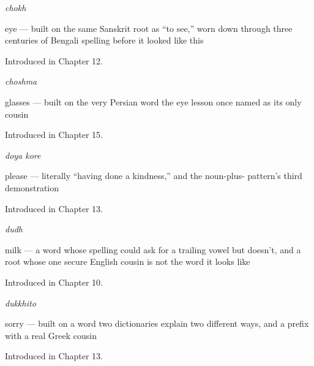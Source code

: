 \noindent\begin{minipage}[t]{\linewidth}
\raggedright
\textbf{}\enspace\emph{chokh}\par
\small eye — built on the same Sanskrit root as \textquotedblleft{}to see,\textquotedblright{} worn down through three centuries of Bengali spelling before it looked like this\par
\footnotesize Introduced in Chapter 12.
\end{minipage}\par\medskip

\noindent\begin{minipage}[t]{\linewidth}
\raggedright
\textbf{}\enspace\emph{choshma}\par
\small glasses — built on the very Persian word the eye lesson once named as its only cousin\par
\footnotesize Introduced in Chapter 15.
\end{minipage}\par\medskip

\noindent\begin{minipage}[t]{\linewidth}
\raggedright
\textbf{ }\enspace\emph{doya kore}\par
\small please — literally \textquotedblleft{}having done a kindness,\textquotedblright{} and the noun-plus- pattern's third demonstration\par
\footnotesize Introduced in Chapter 13.
\end{minipage}\par\medskip

\noindent\begin{minipage}[t]{\linewidth}
\raggedright
\textbf{}\enspace\emph{dudh}\par
\small milk — a word whose spelling could ask for a trailing vowel but doesn't, and a root whose one secure English cousin is not the word it looks like\par
\footnotesize Introduced in Chapter 10.
\end{minipage}\par\medskip

\noindent\begin{minipage}[t]{\linewidth}
\raggedright
\textbf{}\enspace\emph{dukkhito}\par
\small sorry — built on a word two dictionaries explain two different ways, and a prefix with a real Greek cousin\par
\footnotesize Introduced in Chapter 13.
\end{minipage}\par\medskip

